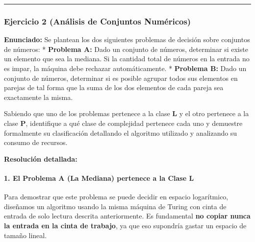 \documentclass[12pt]{book} %
\begin{document}
\begin{center}\rule{0.5\linewidth}{0.5pt}\end{center}

\hypertarget{ejercicio-2-anuxe1lisis-de-conjuntos-numuxe9ricos}{%
\subsubsection{Ejercicio 2 (Análisis de Conjuntos
Numéricos)}\label{ejercicio-2-anuxe1lisis-de-conjuntos-numuxe9ricos}}

\textbf{Enunciado:} Se plantean los dos siguientes problemas de decisión
sobre conjuntos de números: * \textbf{Problema A:} Dado un conjunto de
números, determinar si existe un elemento que sea la mediana. Si la
cantidad total de números en la entrada no es impar, la máquina debe
rechazar automáticamente. * \textbf{Problema B:} Dado un conjunto de
números, determinar si es posible agrupar todos sus elementos en parejas
de tal forma que la suma de los dos elementos de cada pareja sea
exactamente la misma.

Sabiendo que uno de los problemas pertenece a la clase \textbf{L} y el
otro pertenece a la clase \textbf{P}, identifique a qué clase de
complejidad pertenece cada uno y demuestre formalmente su clasificación
detallando el algoritmo utilizado y analizando su consumo de recursos.

\textbf{Resolución detallada:}

\hypertarget{el-problema-a-la-mediana-pertenece-a-la-clase-l}{%
\paragraph{\texorpdfstring{\textbf{1. El Problema A (La Mediana)
pertenece a la Clase
L}}{1. El Problema A (La Mediana) pertenece a la Clase L}}\label{el-problema-a-la-mediana-pertenece-a-la-clase-l}}

Para demostrar que este problema se puede decidir en espacio
logarítmico, diseñamos un algoritmo usando la misma máquina de Turing
con cinta de entrada de solo lectura descrita anteriormente. Es
fundamental \textbf{no copiar nunca la entrada en la cinta de trabajo},
ya que eso supondría gastar un espacio de tamaño lineal.
\end{document}
